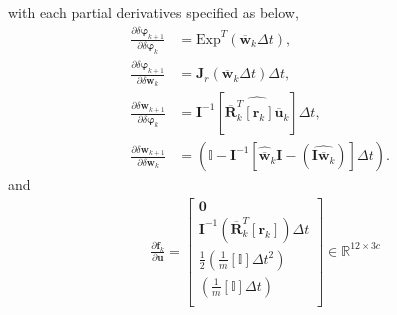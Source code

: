with each partial derivatives specified as below,
\begin{align}
\nonumber\frac{\partial \delta \boldsymbol{\varphi}_{k+1} } {\partial \delta \boldsymbol{\varphi}_{k} } &= \mathrm{Exp}^T(\overline{\mathbf{w}}_{k} \Delta{t}),\\ 
\nonumber\frac{\partial \delta \boldsymbol{\varphi}_{k+1} } {\partial \delta \mathbf{w}_{k} } &= \mathbf{J}_r(\overline{\mathbf{w}}_{k} \Delta{t})\Delta{t},\\ 
\nonumber\frac{\partial \delta \mathbf{w}_{k+1} } {\partial \delta \boldsymbol{\varphi}_{k} } &= 
\mathbf{I}^{-1} [ \widehat{\overline{\mathbf{R}}_{k}^T[\mathbf{r}_k]\overline{\mathbf{u}}_k} ] \Delta{t},\\ 
\nonumber\frac{\partial \delta \mathbf{w}_{k+1} } {\partial \delta \mathbf{w}_{k} } &= 
( \mathbb{I} - \mathbf{I}^{-1} [\widehat{\overline{\mathbf{w}}}_k\mathbf{I} - (\widehat{\mathbf{I}\overline{\mathbf{w}}_k}) ]\Delta{t}).
\end{align}
and
\begin{align}
\label{eq:df_du}
&\frac{\partial \mathbf{f}_k}{\partial \mathbf{u}}=
\left[ {\begin{array}{c}
	\mathbf{0} \\[1mm]
	\mathbf{I}^{-1}\left(\overline{\mathbf{R}}_{k}^T[\mathbf{r}_k] \right)\Delta{t} \\[1mm]
	\frac{1}{2}(\frac{1}{m}[\mathbb{I}]\Delta{t}^2) \\[1mm]
	\left(\frac{1}{m}[\mathbb{I}] \Delta{t}\right) \\[1mm]
	\end{array} } \right] \in \mathbb{R}^{12 \times 3c}
\end{align}
\newline


